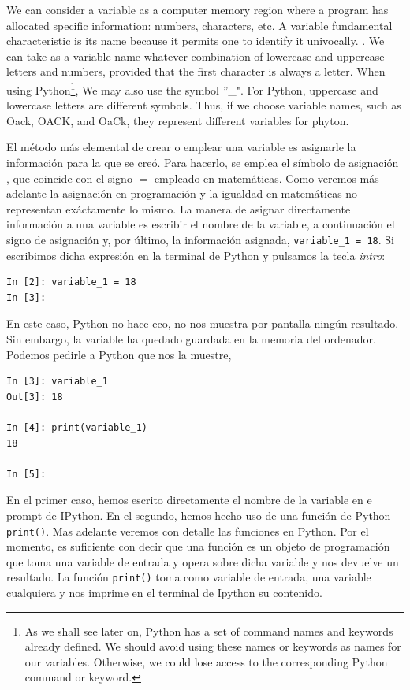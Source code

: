 \begin{paracol}{2}
\switchcolumn
We can consider a variable as a computer memory region where a program has allocated specific information: numbers, characters, etc. A variable fundamental characteristic is its name because it permits one to identify it univocally. . We can take as a variable name whatever combination of lowercase and uppercase letters and numbers, provided that the first character is always a letter. When using Python\footnote{As we shall see later on, Python has a set of command names and keywords already defined. We should avoid using these names or keywords as names for our variables. Otherwise, we could lose access to the corresponding Python command or keyword.}, We may also use the symbol ''\_". For Python, uppercase and lowercase letters are different symbols. Thus, if we choose variable names, such as Oack, OACK, and OaCk, they represent different variables for phyton.

\switchcolumn
El método más elemental de crear o emplear una variable es asignarle la información para la que se creó. Para hacerlo, se emplea el símbolo de asignación  , que coincide con el signo $=$ empleado en matemáticas. Como veremos más adelante la asignación en programación y la igualdad en matemáticas no representan exáctamente lo mismo. La manera de asignar directamente información a una variable es escribir el nombre de la variable, a continuación  el signo de asignación y, por último, la información asignada, \texttt{variable_1 = 18}. Si escribimos dicha expresión en la terminal de Python y pulsamos la tecla \emph{intro}:
\begin{verbatim}
In [2]: variable_1 = 18
In [3]:
\end{verbatim}
En este caso, Python no hace eco, no nos muestra por pantalla ningún resultado. Sin embargo, la variable ha quedado guardada en la memoria del ordenador. Podemos pedirle a Python que nos la muestre, 
\begin{verbatim}
In [3]: variable_1
Out[3]: 18

In [4]: print(variable_1)
18

In [5]: 
\end{verbatim}
En el primer caso, hemos escrito directamente el nombre de la variable en e prompt de IPython. En el segundo, hemos hecho uso de una función de Python \texttt{print()}. Mas adelante veremos con detalle las funciones en Python. Por el momento, es suficiente con decir que una función es un objeto de programación que toma una variable de entrada y opera sobre dicha variable y nos devuelve un resultado. La  función \texttt{print()} toma como variable de entrada, una variable cualquiera y nos imprime en el terminal de Ipython su contenido.


\end{paracol}
